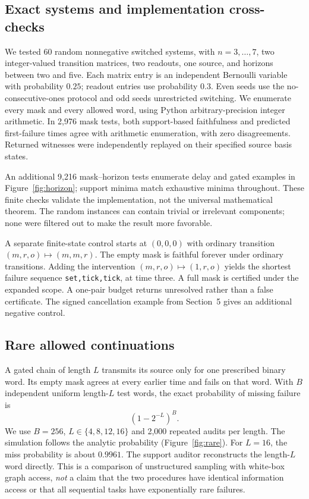 \subsection{Exact systems and implementation cross-checks}
We tested 60 random nonnegative switched systems, with $n=3,\ldots,7$, two integer-valued transition matrices, two readouts, one source, and horizons between two and five. Each matrix entry is an independent Bernoulli variable with probability $0.25$; readout entries use probability $0.3$. Even seeds use the no-consecutive-ones protocol and odd seeds unrestricted switching. We enumerate every mask and every allowed word, using Python arbitrary-precision integer arithmetic. In 2,976 mask tests, both support-based faithfulness and predicted first-failure times agree with arithmetic enumeration, with zero disagreements. Returned witnesses were independently replayed on their specified source basis states.

An additional 9,216 mask--horizon tests enumerate delay and gated examples in Figure~\ref{fig:horizon}; support minima match exhaustive minima throughout. These finite checks validate the implementation, not the universal mathematical theorem. The random instances can contain trivial or irrelevant components; none were filtered out to make the result more favorable.

A separate finite-state control starts at $(0,0,0)$ with ordinary transition $(m,r,o)\mapsto(m,m,r)$. The empty mask is faithful forever under ordinary transitions. Adding the intervention $(m,r,o)\mapsto(1,r,o)$ yields the shortest failure sequence \texttt{set,tick,tick}, at time three. A full mask is certified under the expanded scope. A one-pair budget returns unresolved rather than a false certificate. The signed cancellation example from Section~5 gives an additional negative control.

\subsection{Rare allowed continuations}
A gated chain of length $L$ transmits its source only for one prescribed binary word. Its empty mask agrees at every earlier time and fails on that word. With $B$ independent uniform length-$L$ test words, the exact probability of missing failure is
\begin{equation}
 (1-2^{-L})^B.
\end{equation}
We use $B=256$, $L\in\{4,8,12,16\}$ and 2,000 repeated audits per length. The simulation follows the analytic probability (Figure~\ref{fig:rare}). For $L=16$, the miss probability is about $0.9961$. The support auditor reconstructs the length-$L$ word directly. This is a comparison of unstructured sampling with white-box graph access, \emph{not} a claim that the two procedures have identical information access or that all sequential tasks have exponentially rare failures.

